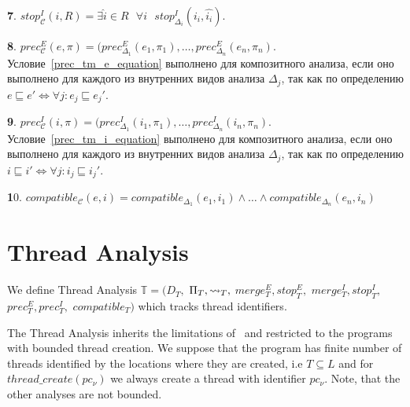 {\textbf 7.}
$stop^I_{\mathscr{C}}(i,R)=\exists \widehat{i} \in R \mbox{ } \forall i \mbox{ } stop^I_{\Delta_i}(i_i, \widehat{i_i})$.

{\textbf 8.}
$prec^E_{\mathscr{C}}(e,\pi)=(prec^E_{\Delta_1}(e_1, \pi_1), \dots, prec^E_{\Delta_n}(e_n, \pi_n)$. Условие~\ref{prec_tm_e_equation} выполнено для композитного анализа, если оно выполнено для каждого из внутренних видов анализа $\Delta_j$, так как по определению $e \sqsubseteq e' \iff \forall j: e_j \sqsubseteq e_j'$.

{\textbf 9.}
$prec^I_{\mathscr{C}}(i,\pi)=(prec^I_{\Delta_1}(i_1, \pi_1), \dots, prec^I_{\Delta_n}(i_n, \pi_n)$. Условие~\ref{prec_tm_i_equation} выполнено для композитного анализа, если оно выполнено для каждого из внутренних видов анализа $\Delta_j$, так как по определению $i \sqsubseteq i' \iff \forall j: i_j \sqsubseteq i_j'$.

{\textbf 10.} 
$compatible_{\mathscr{C}}(e, i) = compatible_{\Delta_1}(e_1, i_1) \land \dots \land compatible_{\Delta_n}(e_n, i_n)$

\section{Thread Analysis}
\label{sect_thread_analysis}
We define Thread Analysis 
$\mathbb{T}=(D_{T},$ $\Pi_{T}, \leadsto_{T},$ $merge^E_{T}, stop^E_{T},$ $merge^I_{T}, stop^I_{T},$ $prec^E_{T},prec^I_{T},$ $compatible_{T})$ which tracks thread identifiers.

The Thread Analysis inherits the limitations of~\cite{ThreadModular03} and restricted to the programs with bounded thread creation. We suppose that the program has finite number of threads identified by the locations where they are created, i.e $T\subseteq L$ and for $thread\_create(pc_\nu)$ we always create a thread with identifier $pc_\nu$. Note, that the other analyses are not bounded.

